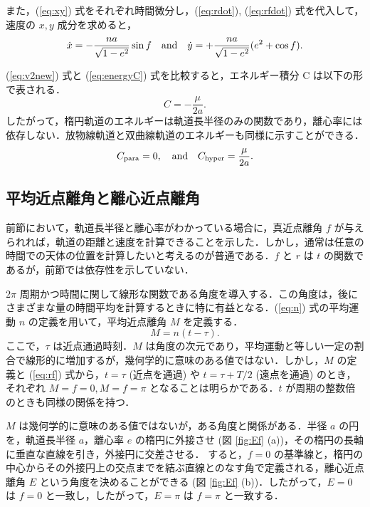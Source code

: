\documentclass[11pt,a4paper,oneside,onecolumn]{jarticle}
\begin{document}
また，(\ref{eq:xy}) 式をそれぞれ時間微分し，(\ref{eq:rdot}),  (\ref{eq:rfdot}) 式を代入して，速度の $x, y$ 成分を求めると，
\begin{equation}
\dot{x} = - \frac{n a}{\sqrt{1 - e^2}} \sin f \quad {\rm and} \quad  \dot{y} = + \frac{n a}{\sqrt{1 - e^2}} (e^2 + \cos f). \label{eq:xdotydot}
\end{equation}

(\ref{eq:v2new}) 式と (\ref{eq:energyC}) 式を比較すると，エネルギー積分 C は以下の形で表される．
\begin{equation}
C = - \frac{\mu}{2 a}. \label{eq:C}
\end{equation}
したがって，楕円軌道のエネルギーは軌道長半径のみの関数であり，離心率には依存しない．放物線軌道と双曲線軌道のエネルギーも同様に示すことができる．
\begin{equation}
C_{{\rm para}} = 0, \quad {\rm and} \quad C_{{\rm hyper}} = \frac{\mu}{2 a}.
\end{equation}

\subsection{平均近点離角と離心近点離角}
前節において，軌道長半径と離心率がわかっている場合に，真近点離角 $f$ が与えられれば，軌道の距離と速度を計算できることを示した．しかし，通常は任意の時間での天体の位置を計算したいと考えるのが普通である．$f$ と $r$ は $t$ の関数であるが，前節では依存性を示していない．

$2 \pi$ 周期かつ時間に関して線形な関数である角度を導入する．この角度は，後にさまざまな量の時間平均を計算するときに特に有益となる．(\ref{eq:n}) 式の平均運動 $n$ の定義を用いて，平均近点離角 $M$ を定義する．
\begin{equation}
M = n (t - \tau). \label{eq:M}
\end{equation}
ここで，$\tau$ は近点通過時刻．$M$ は角度の次元であり，平均運動と等しい一定の割合で線形的に増加するが，幾何学的に意味のある値ではない．しかし，$M$ の定義と (\ref{eq:rf}) 式から，$t = \tau$ (近点を通過) や $t = \tau + T / 2$ (遠点を通過) のとき，それぞれ $M = f =0, M = f = \pi$ となることは明らかである．$t$ が周期の整数倍のときも同様の関係を持つ．

$M$ は幾何学的に意味のある値ではないが，ある角度と関係がある．半径 $a$ の円を，軌道長半径 $a$，離心率 $e$ の楕円に外接させ (図 \ref{fig:Ef} (a))，その楕円の長軸に垂直な直線を引き，外接円に交差させる． すると，$f = 0$ の基準線と，楕円の中心からその外接円上の交点までを結ぶ直線とのなす角で定義される，離心近点離角 $E$ という角度を決めることができる (図 \ref{fig:Ef} (b))．したがって，$E = 0$ は $f = 0$ と一致し，したがって，$E = \pi$ は $f = \pi$ と一致する．
\end{document}
